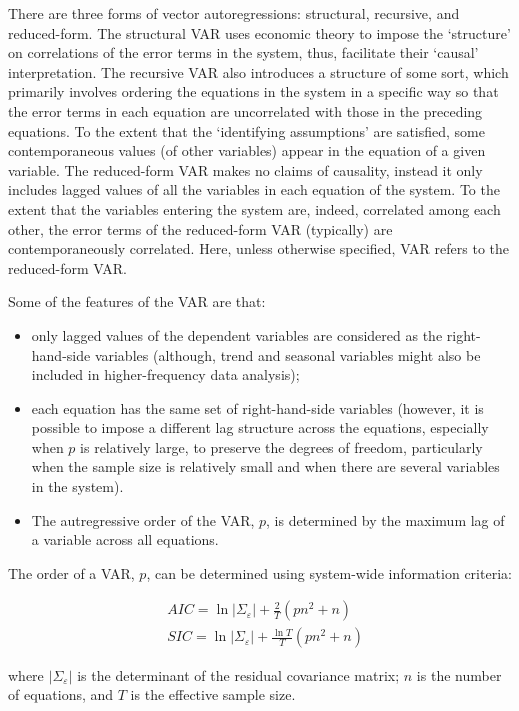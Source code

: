 \documentclass[
  12pt,
  oneside]{book}
\providecommand{\tightlist}{%
  \setlength{\itemsep}{0pt}\setlength{\parskip}{0pt}}
\begin{document}
There are three forms of vector autoregressions: structural, recursive, and reduced-form. The structural VAR uses economic theory to impose the `structure' on correlations of the error terms in the system, thus, facilitate their `causal' interpretation. The recursive VAR also introduces a structure of some sort, which primarily involves ordering the equations in the system in a specific way so that the error terms in each equation are uncorrelated with those in the preceding equations. To the extent that the `identifying assumptions' are satisfied, some contemporaneous values (of other variables) appear in the equation of a given variable. The reduced-form VAR makes no claims of causality, instead it only includes lagged values of all the variables in each equation of the system. To the extent that the variables entering the system are, indeed, correlated among each other, the error terms of the reduced-form VAR (typically) are contemporaneously correlated. Here, unless otherwise specified, VAR refers to the reduced-form VAR.

Some of the features of the VAR are that:

\begin{itemize}
\tightlist
\item
  only lagged values of the dependent variables are considered as the right-hand-side variables (although, trend and seasonal variables might also be included in higher-frequency data analysis);
\item
  each equation has the same set of right-hand-side variables (however, it is possible to impose a different lag structure across the equations, especially when \(p\) is relatively large, to preserve the degrees of freedom, particularly when the sample size is relatively small and when there are several variables in the system).
\item
  The autregressive order of the VAR, \(p\), is determined by the maximum lag of a variable across all equations.
\end{itemize}

The order of a VAR, \(p\), can be determined using system-wide information criteria:

\[\begin{aligned}
& AIC = \ln\left|\Sigma_{\varepsilon}\right| + \frac{2}{T}(pn^2+n) \\
& SIC = \ln\left|\Sigma_{\varepsilon}\right| + \frac{\ln{T}}{T}(pn^2+n)
\end{aligned}\]

where \(\left|\Sigma_{\varepsilon}\right|\) is the determinant of the residual covariance matrix; \(n\) is the number of equations, and \(T\) is the effective sample size.
\end{document}

